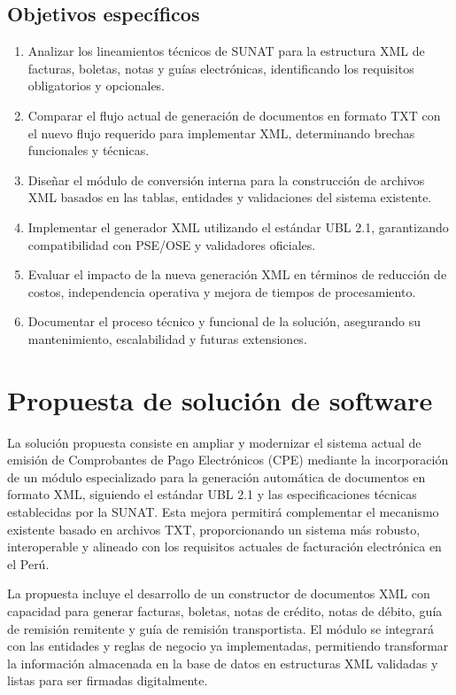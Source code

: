 \documentclass[12pt, a4paper]{article}
\begin{document}
\subsection{Objetivos específicos}
\begin{enumerate}[label=\arabic*.]
  \item Analizar los lineamientos técnicos de SUNAT para la estructura XML de facturas, boletas, notas y guías electrónicas, identificando los requisitos obligatorios y opcionales.
  \item Comparar el flujo actual de generación de documentos en formato TXT con el nuevo flujo requerido para implementar XML, determinando brechas funcionales y técnicas.
  \item Diseñar el módulo de conversión interna para la construcción de archivos XML basados en las tablas, entidades y validaciones del sistema existente.
  \item Implementar el generador XML utilizando el estándar UBL 2.1, garantizando compatibilidad con PSE/OSE y validadores oficiales.
  \item Evaluar el impacto de la nueva generación XML en términos de reducción de costos, independencia operativa y mejora de tiempos de procesamiento.
  \item Documentar el proceso técnico y funcional de la solución, asegurando su mantenimiento, escalabilidad y futuras extensiones.
\end{enumerate}


\section{Propuesta de solución de software}
La solución propuesta consiste en ampliar y modernizar el sistema actual de emisión de Comprobantes de Pago Electrónicos (CPE) mediante la incorporación de un módulo especializado para la generación automática de documentos en formato XML, siguiendo el estándar UBL 2.1 y las especificaciones técnicas establecidas por la SUNAT. Esta mejora permitirá complementar el mecanismo existente basado en archivos TXT, proporcionando un sistema más robusto, interoperable y alineado con los requisitos actuales de facturación electrónica en el Perú.

La propuesta incluye el desarrollo de un constructor de documentos XML con capacidad para generar facturas, boletas, notas de crédito, notas de débito, guía de remisión remitente y guía de remisión transportista. El módulo se integrará con las entidades y reglas de negocio ya implementadas, permitiendo transformar la información almacenada en la base de datos en estructuras XML validadas y listas para ser firmadas digitalmente.
\end{document}
